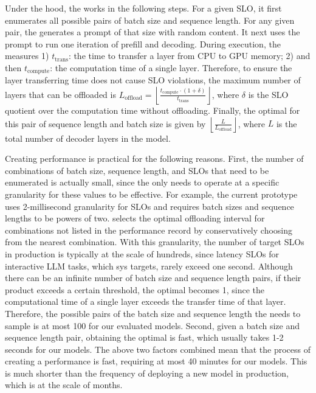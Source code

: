 Under the hood, the \analyzer works in the following steps. 
%
For a given SLO, it first enumerates all possible pairs of batch size and sequence length. 
%
For any given pair, the \analyzer generates a prompt of that size with 
random content. 
%
It next uses the prompt to run one iteration of prefill and decoding. 
%
During execution, the \analyzer measures 1) $t_\text{trans}$: 
the time to transfer a layer from CPU to GPU memory; 2) 
and then $t_\text{compute}$: the computation time of a single layer. 
%
Therefore, to ensure the layer transferring time does not cause SLO violations, 
the maximum number of layers that can be offloaded 
is $L_{\text{offload}} = \left\lfloor \frac{t_\text{compute} \cdot (1 + \delta)}{t_\text{trans}} \right\rfloor$, where $\delta$ is the SLO quotient
over the computation time without offloading. 
%
Finally, the optimal \interval for this pair of sequence length and batch size is given by \(\left\lfloor \frac{L}{L_{\text{offload}}} \right\rfloor\), 
where \(L\) is the total number of decoder layers in the model.




Creating performance \records is practical for the following reasons. 
%
First, the number of combinations of batch size, sequence length, and SLOs that need to be enumerated is actually small, since the \analyzer only needs to operate at a specific granularity for these values to be effective.
%
For example, the current prototype uses 2-millisecond granularity for SLOs and requires batch sizes and sequence lengths to be powers of two.
%
\sys selects the optimal offloading interval for combinations not listed in the performance record by conservatively choosing from the nearest combination.
%
With this granularity, the number of target SLOs in production is typically 
at the scale of hundreds, since latency SLOs for interactive LLM tasks, which
sys targets, rarely exceed one second.
% 
Although there can be an infinite number of batch size and sequence length pairs, if their product exceeds a certain threshold, the optimal \interval becomes 1, since the computational time of a single layer exceeds the 
transfer time of that layer.  
%
Therefore, the possible pairs of the batch size and sequence length the \analyzer needs to sample is at most 100 for our evaluated models.  
%
Second, given a batch size and sequence length pair, obtaining the optimal
\interval is fast, which usually takes 1-2 seconds for our models. 
%
The above two factors combined mean that the process of creating a performance \record is fast, requiring at most 40 minutes for our models. 
%
This is much shorter than the frequency of deploying a new model in production, 
which is at the scale of months. 


